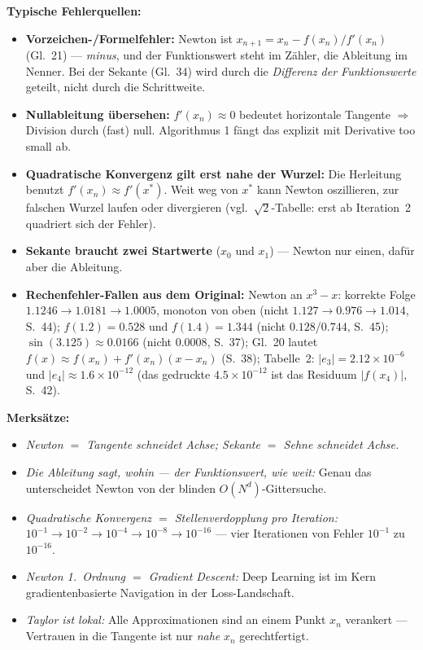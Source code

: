 \begin{merkbox}
\textbf{Typische Fehlerquellen:}
\begin{itemize}[nosep]
  \item \textbf{Vorzeichen-/Formelfehler:} Newton ist $x_{n+1} = x_n - f(x_n)/f'(x_n)$ (Gl.~21) — \emph{minus}, und der Funktionswert steht im Zähler, die Ableitung im Nenner. Bei der Sekante (Gl.~34) wird durch die \emph{Differenz der Funktionswerte} geteilt, nicht durch die Schrittweite.
  \item \textbf{Nullableitung übersehen:} $f'(x_n) \approx 0$ bedeutet horizontale Tangente $\Rightarrow$ Division durch (fast) null. Algorithmus 1 fängt das explizit mit \glqq Derivative too small\grqq{} ab.
  \item \textbf{Quadratische Konvergenz gilt erst nahe der Wurzel:} Die Herleitung benutzt $f'(x_n) \approx f'(x^*)$. Weit weg von $x^*$ kann Newton oszillieren, zur falschen Wurzel laufen oder divergieren (vgl.\ $\sqrt{2}$-Tabelle: erst ab Iteration~2 quadriert sich der Fehler).
  \item \textbf{Sekante braucht zwei Startwerte} ($x_0$ und $x_1$) — Newton nur einen, dafür aber die Ableitung.
  \item \textbf{Rechenfehler-Fallen aus dem Original:} Newton an $x^3 - x$: korrekte Folge $1.1246 \to 1.0181 \to 1.0005$, monoton von oben (nicht $1.127 \to 0.976 \to 1.014$, S.~44); $f(1.2) = 0.528$ und $f(1.4) = 1.344$ (nicht $0.128$/$0.744$, S.~45); $\sin(3.125) \approx 0.0166$ (nicht $0.0008$, S.~37); Gl.~20 lautet $f(x) \approx f(x_n) + f'(x_n)(x - x_n)$ (S.~38); Tabelle~2: $|e_3| = 2.12 \times 10^{-6}$ und $|e_4| \approx 1.6 \times 10^{-12}$ (das gedruckte $4.5 \times 10^{-12}$ ist das Residuum $|f(x_4)|$, S.~42).
\end{itemize}
\textbf{Merksätze:}
\begin{itemize}[nosep]
  \item \emph{Newton $=$ Tangente schneidet Achse; Sekante $=$ Sehne schneidet Achse.}
  \item \emph{Die Ableitung sagt, wohin — der Funktionswert, wie weit:} Genau das unterscheidet Newton von der blinden $O(N^d)$-Gittersuche.
  \item \emph{Quadratische Konvergenz $=$ Stellenverdopplung pro Iteration:} $10^{-1} \to 10^{-2} \to 10^{-4} \to 10^{-8} \to 10^{-16}$ — vier Iterationen von Fehler $10^{-1}$ zu $10^{-16}$.
  \item \emph{Newton 1.~Ordnung $=$ Gradient Descent:} Deep Learning ist im Kern gradientenbasierte Navigation in der Loss-Landschaft.
  \item \emph{Taylor ist lokal:} Alle Approximationen sind an einem Punkt $x_n$ verankert — Vertrauen in die Tangente ist nur \emph{nahe} $x_n$ gerechtfertigt.
\end{itemize}
\end{merkbox}
